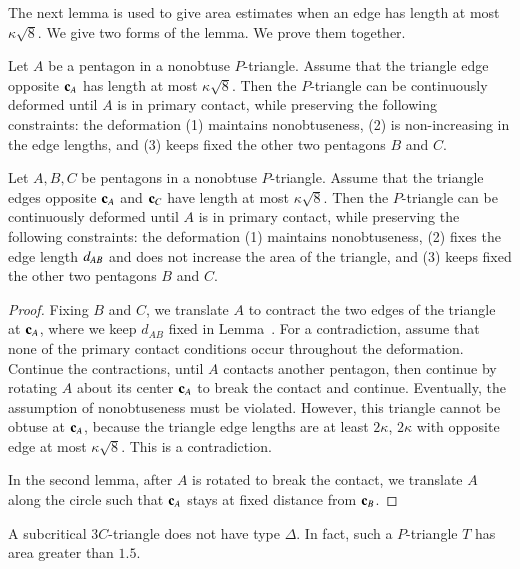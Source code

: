 The next lemma is used to give area estimates when an edge has length
at most $\kappa\sqrt{8}$.  We give two forms of the lemma.  We prove
them together.

\begin{lemma} 
  Let $A$ be a pentagon in a nonobtuse $P$-triangle.  Assume that the
  triangle edge opposite ${\mathbf c}_A$ has length at most $\kappa\sqrt{8}$.
  Then the $P$-triangle can be continuously deformed until $A$ is in
  primary contact, while preserving the following constraints: the
  deformation (1) maintains nonobtuseness, (2) is non-increasing in
  the edge lengths, and (3) keeps fixed the other two pentagons $B$
  and $C$.
\end{lemma}

\begin{lemma} 
  Let $A,B,C$ be pentagons in a nonobtuse $P$-triangle.  Assume that
  the triangle edges opposite ${\mathbf c}_A$ and ${\mathbf c}_C$ have length at most
  $\kappa\sqrt{8}$.  Then the $P$-triangle can be continuously
  deformed until $A$ is in primary contact, while preserving the
  following constraints: the deformation (1) maintains nonobtuseness,
  (2) fixes the edge length $d_{AB}$ and does not increase the area
  of the triangle, and (3) keeps fixed the other two pentagons $B$ and
  $C$.
\end{lemma}

\begin{proof} Fixing $B$ and $C$, we translate $A$ to contract the two
  edges of the triangle at ${\mathbf c}_A$, where we keep $d_{AB}$ fixed in
  Lemma~.  For a contradiction, assume that none
  of the primary contact conditions occur throughout the deformation.
  Continue the contractions, until $A$ contacts another pentagon, then
  continue by rotating $A$ about its center ${\mathbf c}_A$ to break the
  contact and continue.  Eventually, the assumption of nonobtuseness
  must be violated.  However, this triangle cannot be obtuse at
  ${\mathbf c}_A$, because the triangle edge lengths are at least $2 \kappa$,
  $2 \kappa$ with opposite edge at most $\kappa\sqrt{8}$. This is a
  contradiction.

  In the second lemma, after $A$ is rotated to break the contact, we
  translate $A$ along the circle such that ${\mathbf c}_A$ stays at fixed
  distance from ${\mathbf c}_B$.
\end{proof}

\begin{lemma} 
  A subcritical $3C$-triangle does not have type $\Delta$.  In fact,
  such a $P$-triangle $T$ has area greater than $1.5$.
\end{lemma}

